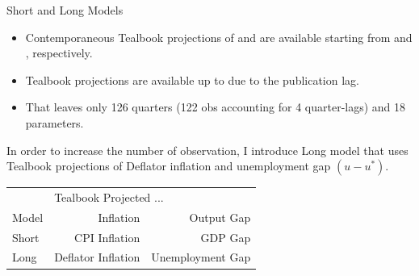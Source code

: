 \documentclass[10pt,aspectratio=169]{beamer}
\begin{document}
\begin{frame}{Short and Long Models}
    \begin{itemize}
        \item Contemporaneous Tealbook projections of  and  are available starting from  and , respectively. 
        \item Tealbook projections are available up to  due to the publication lag.
        \item That leaves only 126 quarters (122 obs accounting for 4 quarter-lags) and 18 parameters.
    \end{itemize}

    In order to increase the number of observation, I introduce Long model that uses Tealbook projections of Deflator inflation and unemployment gap $(u-u^*)$.

    \begin{table}[!h]\centering \small
    \begin{tabular}{lrr}\hline\hline
        &\multicolumn{2}{l}{Tealbook Projected ...}\\ \cline{2-3} 
        Model &  Inflation & Output Gap\\ 
        \hline
        Short & CPI Inflation & GDP Gap\\ 
        Long& Deflator Inflation & Unemployment Gap\\ \hline\hline
    \end{tabular}
    \end{table}

\end{frame}










    



\begin{frame}
\end{frame}
    
\end{document}
